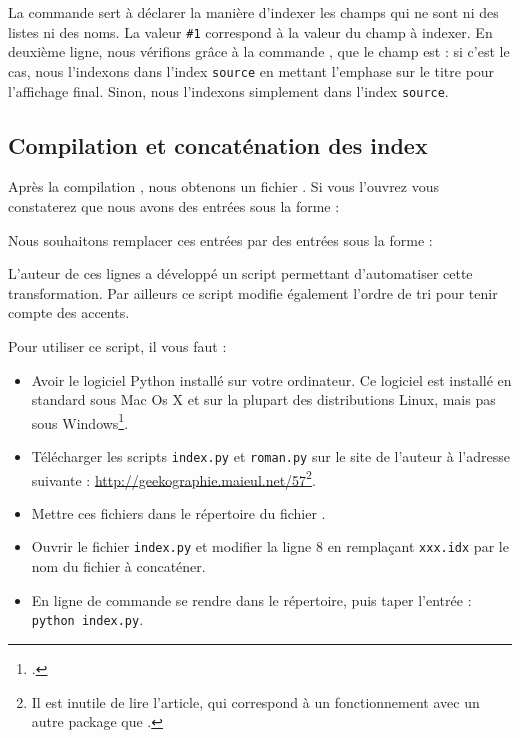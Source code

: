 La commande  sert à déclarer la manière d'indexer les champs qui ne sont ni des listes ni des noms. La valeur \verb|#1| correspond à la valeur du champ à indexer. En deuxième ligne, nous vérifions grâce à la commande , que le champ    est  : si c'est le cas, nous l'indexons dans l'index \verb|source| en mettant l'emphase sur le titre pour l'affichage final. Sinon, nous l'indexons simplement dans l'index \verb|source|.

\subsection{Compilation et concaténation des index}\label{scriptpython}


Après la  compilation \XeLaTeX, nous obtenons un fichier . Si vous l'ouvrez vous constaterez que nous avons des entrées sous la forme : 

\begin{latexcode}
\end{latexcode}

Nous souhaitons remplacer ces entrées par des entrées sous la forme :

\begin{latexcode}
\end{latexcode}

L'auteur de ces lignes a développé un script permettant d'automatiser cette transformation. Par ailleurs ce script modifie également l'ordre de tri pour tenir compte des accents.

Pour utiliser ce script, il vous faut :\label{python}
\begin{itemize}
\item Avoir le logiciel Python installé sur votre ordinateur. Ce logiciel est installé en standard sous Mac Os X et sur la plupart des distributions Linux, mais pas sous Windows\footcite{python_windows}.
\item Télécharger les scripts \verb|index.py| et \verb|roman.py| sur le site de l'auteur à l'adresse suivante : \url{http://geekographie.maieul.net/57}\footnote{Il est inutile de lire l'article, qui correspond à un fonctionnement avec un autre package que .}.
\item Mettre ces fichiers dans le répertoire du fichier . 
\item Ouvrir le fichier \verb|index.py| et modifier la ligne 8 en remplaçant \verb|xxx.idx| par le nom du fichier à concaténer.
\item En ligne de commande se rendre dans le  répertoire, puis taper l'entrée : \verb|python index.py|.
\end{itemize}


